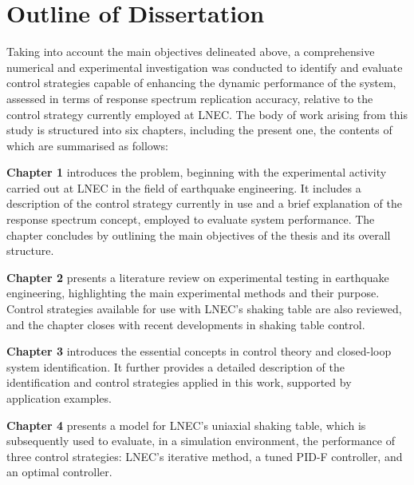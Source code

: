 \documentclass[  10pt, twoside]{report} %
\numberwithin{equation}{chapter}
\begin{document}
\clearpage
\section{Outline of Dissertation}
Taking into account the main objectives delineated above, a comprehensive numerical and experimental investigation was conducted to identify and evaluate control strategies capable of enhancing the dynamic performance of the system, assessed in terms of response spectrum replication accuracy, relative to the control strategy currently employed at LNEC. The body of work arising from this study is structured into six chapters, including the present one, the contents of which are summarised as follows:

\textbf{Chapter 1} introduces the problem, beginning with the experimental activity carried out at LNEC in the field of earthquake engineering. It includes a description of the control strategy currently in use and a brief explanation of the response spectrum concept, employed to evaluate system performance. The chapter concludes by outlining the main objectives of the thesis and its overall structure.

\textbf{Chapter 2} presents a literature review on experimental testing in earthquake engineering, highlighting the main experimental methods and their purpose. Control strategies available for use with LNEC's shaking table are also reviewed, and the chapter closes with recent developments in shaking table control.

\textbf{Chapter 3} introduces the essential concepts in control theory and closed-loop system identification. It further provides a detailed description of the identification and control strategies applied in this work, supported by application examples.

\textbf{Chapter 4} presents a model for LNEC's uniaxial shaking table, which is subsequently used to evaluate, in a simulation environment, the performance of three control strategies: LNEC's iterative method, a tuned PID-F controller, and an optimal controller.
\end{document}
